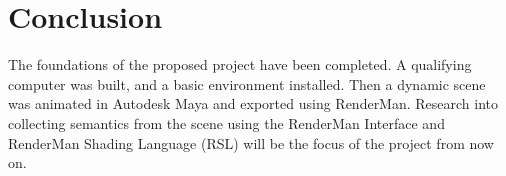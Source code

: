 \documentclass[conference]{IEEEtran}
\begin{document}
\section{Conclusion}
\label{sec:conclusion}
The foundations of the proposed project have been completed.
A qualifying computer was built, and a basic environment installed.
Then a dynamic scene was animated in Autodesk Maya and exported
using RenderMan. Research into collecting semantics from the scene using
the RenderMan Interface and RenderMan Shading Language (RSL)
will be the focus of the project from now on.




\end{document}
